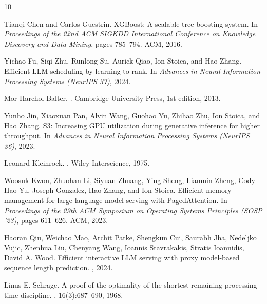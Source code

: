 \documentclass[10pt]{article}
\begin{document}
\begin{thebibliography}{10}

Tianqi Chen and Carlos Guestrin.
\newblock XGBoost: A scalable tree boosting system.
\newblock In {\em Proceedings of the 22nd ACM SIGKDD International Conference on Knowledge Discovery and Data Mining}, pages 785--794. ACM, 2016.

Yichao Fu, Siqi Zhu, Runlong Su, Aurick Qiao, Ion Stoica, and Hao Zhang.
\newblock Efficient LLM scheduling by learning to rank.
\newblock In {\em Advances in Neural Information Processing Systems (NeurIPS 37)}, 2024.

Mor Harchol-Balter.
.
\newblock Cambridge University Press, 1st edition, 2013.

Yunho Jin, Xiaoxuan Pan, Alvin Wang, Guohao Yu, Zhihao Zhu, Ion Stoica, and Hao Zhang.
\newblock S3: Increasing GPU utilization during generative inference for higher throughput.
\newblock In {\em Advances in Neural Information Processing Systems (NeurIPS 36)}, 2023.

Leonard Kleinrock.
.
\newblock Wiley-Interscience, 1975.

Woosuk Kwon, Zhuohan Li, Siyuan Zhuang, Ying Sheng, Lianmin Zheng, Cody Hao Yu, Joseph Gonzalez, Hao Zhang, and Ion Stoica.
\newblock Efficient memory management for large language model serving with PagedAttention.
\newblock In {\em Proceedings of the 29th ACM Symposium on Operating Systems Principles (SOSP '23)}, pages 611--626. ACM, 2023.

Haoran Qiu, Weichao Mao, Archit Patke, Shengkun Cui, Saurabh Jha, Nedeljko Vujic, Zhenhua Liu, Chenyang Wang, Ioannis Stavrakakis, Stratis Ioannidis, David A. Wood.
\newblock Efficient interactive LLM serving with proxy model-based sequence length prediction.
, 2024.

Linus E. Schrage.
\newblock A proof of the optimality of the shortest remaining processing time discipline.
, 16(3):687--690, 1968.


\end{thebibliography}
\end{document}
